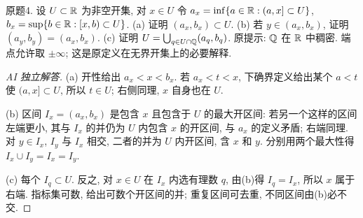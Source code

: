 \begin{exercise}\label{ps03:4}
原题4. 设 $U\subset\mathbb R$ 为非空开集, 对 $x\in U$ 令 $a_x=\inf\{a\in\mathbb R:(a,x]\subset U\}$, $b_x=\sup\{b\in\mathbb R:[x,b)\subset U\}$. (a) 证明 $(a_x,b_x)\subset U$. (b) 若 $y\in(a_x,b_x)$, 证明 $(a_y,b_y)=(a_x,b_x)$. (c) 证明 $U=\bigcup_{q\in U\cap\mathbb Q}(a_q,b_q)$. 原提示: $\mathbb Q$ 在 $\mathbb R$ 中稠密. 端点允许取 $\pm\infty$; 这是原定义在无界开集上的必要解释.
\end{exercise}
\begin{proof}[AI 独立解答]
(a) 开性给出 $a_x<x<b_x$. 若 $a_x<t<x$, 下确界定义给出某个 $a<t$ 使 $(a,x]\subset U$, 所以 $t\in U$; 右侧同理, $x$ 自身也在 $U$.

(b) 区间 $I_x=(a_x,b_x)$ 是包含 $x$ 且包含于 $U$ 的最大开区间: 若另一个这样的区间左端更小, 其与 $I_x$ 的并仍为 $U$ 内包含 $x$ 的开区间, 与 $a_x$ 的定义矛盾; 右端同理. 对 $y\in I_x$, $I_y$ 与 $I_x$ 相交, 二者的并为 $U$ 内开区间, 含 $x$ 和 $y$. 分别用两个最大性得 $I_x\cup I_y=I_x=I_y$.

(c) 每个 $I_q\subset U$. 反之, 对 $x\in U$ 在 $I_x$ 内选有理数 $q$, 由(b)得 $I_q=I_x$, 所以 $x$ 属于右端. 指标集可数, 给出可数个开区间的并; 重复区间可去重, 不同区间由(b)必不交.
\end{proof}
